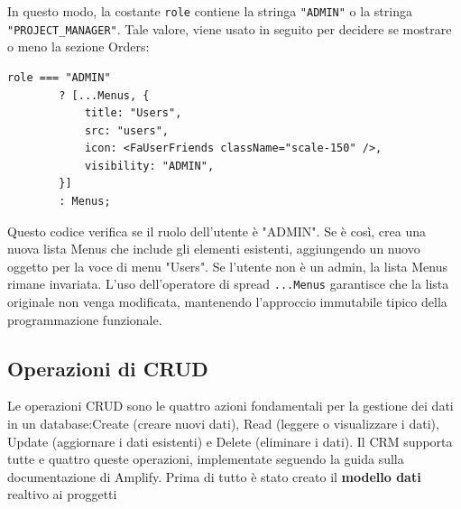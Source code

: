 \documentclass[target=bach,aauheader=,style=]{thud}
\begin{document}
\noindent In questo modo, la costante \texttt{role} contiene la stringa \texttt{"ADMIN"} o la stringa  \texttt{"PROJECT\_MANAGER"}. Tale valore, viene usato in seguito per decidere se mostrare o meno la sezione Orders:

\begin{lstlisting}[caption=Verifica ruolo]
    role === "ADMIN" 
        ? [...Menus, {
            title: "Users",
            src: "users",
            icon: <FaUserFriends className="scale-150" />,
            visibility: "ADMIN",
        }]
        : Menus;
\end{lstlisting}

\noindent Questo codice verifica se il ruolo dell'utente è "ADMIN". Se è così, crea una nuova lista Menus che include gli elementi esistenti, aggiungendo un nuovo oggetto per la voce di menu "Users". Se l'utente non è un admin, la lista Menus rimane invariata. L'uso dell'operatore di spread \texttt{...Menus} garantisce che la lista originale non venga modificata, mantenendo l'approccio immutabile tipico della programmazione funzionale.

\subsection{Operazioni di CRUD}
Le operazioni CRUD sono le quattro azioni fondamentali per la gestione dei dati in un database:Create (creare nuovi dati), Read (leggere o visualizzare i dati), Update (aggiornare i dati esistenti) e Delete (eliminare i dati). Il CRM supporta tutte e quattro queste operazioni, implementate seguendo la guida \cite{awsamplifynextjs2024} sulla documentazione di Amplify. Prima di tutto è stato creato il \textbf{modello dati} realtivo ai proggetti
\end{document}
